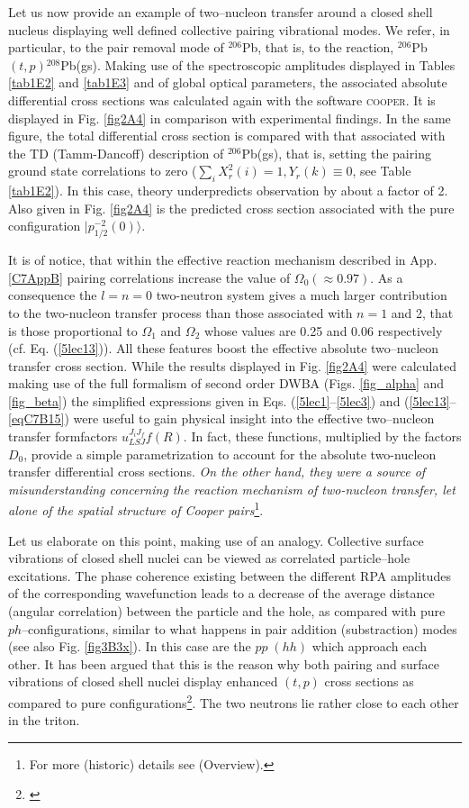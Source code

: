 Let us now provide an example of two--nucleon transfer around a closed shell nucleus displaying well defined collective pairing vibrational modes. We refer, in particular, to the pair removal mode of $^{206}$Pb, that is, to the reaction, $^{206}$Pb$(t,p)$$^{208}$Pb(gs). Making use of the spectroscopic amplitudes displayed in Tables \ref{tab1E2} and \ref{tab1E3} and of global optical parameters, the associated  absolute differential cross sections was calculated again with the software \textsc{cooper}. It is displayed in Fig. \ref{fig2A4} in comparison with experimental findings. In  the same figure, the total differential cross section is compared with that associated with the TD (Tamm-Dancoff) description of $^{206}$Pb(gs), that is, setting the pairing ground state correlations to zero ($\sum_i X^2_r(i)=1, Y_r(k)\equiv 0$, see Table \ref{tab1E2}). In this case, theory underpredicts observation by about a factor of 2.  Also given in Fig. \ref{fig2A4} is the predicted cross section associated with the pure configuration $|p_{1/2}^{-2}(0)\rangle$. 


It is of notice, that within the effective reaction mechanism described in App. \ref{C7AppB} pairing correlations increase the value of $\Omega_0(\approx 0.97)$. As a consequence the   $l=n=0$ two-neutron system gives a much larger contribution to the two-nucleon transfer process than those associated with $n=1$ and 2, that is those proportional to $\Omega_1$ and $\Omega_2$ whose values are 0.25 and 0.06 respectively (cf. Eq. (\ref{5lec13})). All these features boost the effective absolute two--nucleon  transfer cross section. While the results displayed in Fig. \ref{fig2A4} were calculated making use of the full formalism of second order DWBA (Figs. \ref{fig_alpha} and \ref{fig_beta}) the simplified expressions given in Eqs. (\ref{5lec1}--\ref{5lec3}) and (\ref{5lec13}--\ref{eqC7B15}) were useful to gain physical insight into the effective  two--nucleon transfer formfactors $u^{J_iJ_f}_{LSJ}f(R)$. In fact, these functions, multiplied by the factors $D_0$, provide a simple parametrization to account for the absolute two-nucleon transfer  differential cross sections. \emph{On the other hand, they were a source of misunderstanding concerning the reaction mechanism of two-nucleon transfer, let alone of the spatial structure of Cooper pairs}\footnote{For more (historic) details see \cite{Broglia:19d} (Overview).}.


 Let us elaborate on this point, making use of an analogy. Collective surface vibrations of closed shell nuclei can be viewed as correlated particle--hole excitations. The phase coherence existing between the different RPA amplitudes of the corresponding wavefunction leads to a decrease of the average distance (angular correlation) between the particle and the hole, as compared with pure $ph$--configurations, similar to what happens in pair addition (substraction) modes (see also Fig. \ref{fig3B3x}). In this case are the $pp\;(hh)$ which approach each other. It has been argued that this is the reason why both pairing and surface vibrations of closed shell nuclei display enhanced $(t,p)$ cross sections as compared to pure configurations\footnote{\cite{Bertsch:67}}. The two neutrons lie rather close to each other in the triton.


